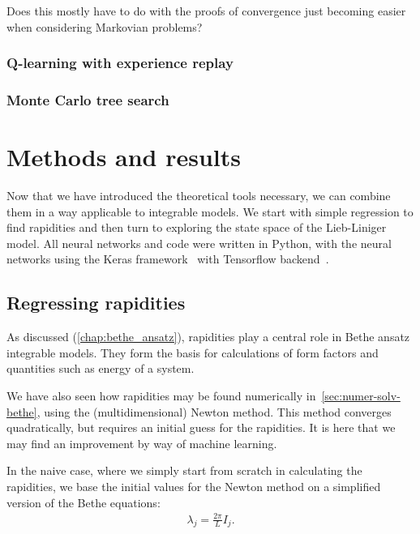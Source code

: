 \documentclass[11pt, a4paper]{report} %
\begin{document}
Does this mostly have to do with the proofs of convergence just becoming easier when considering Markovian problems?

\subsection{Q-learning with experience replay}

\subsection{Monte Carlo tree search}






\chapter{Methods and results}\label{chap:results}

Now that we have introduced the theoretical tools necessary, we can combine them in a way applicable to integrable models.
We start with simple regression to find rapidities and then turn to exploring the state space of the Lieb-Liniger model.
All neural networks and code were written in Python, with the neural networks using the Keras framework~\cite{chollet2015keras} with Tensorflow backend~\cite{tensorflow2015-whitepaper}.

\section{Regressing rapidities}

As discussed (\cref{chap:bethe_ansatz}), rapidities play a central role in Bethe ansatz integrable models.
They form the basis for calculations of form factors and quantities such as energy of a system.

We have also seen how rapidities may be found numerically in~\cref{sec:numer-solv-bethe}, using the (multidimensional) Newton method.
This method converges quadratically, but requires an initial guess for the rapidities.
It is here that we may find an improvement by way of machine learning.

In the naive case, where we simply start from scratch in calculating the rapidities, we base the initial values for the Newton method on a simplified version of the Bethe equations:
\begin{align}
  \label{eq:12}
  \lambda_j = \frac{2\pi}{L} I_j.
\end{align}
\end{document}
